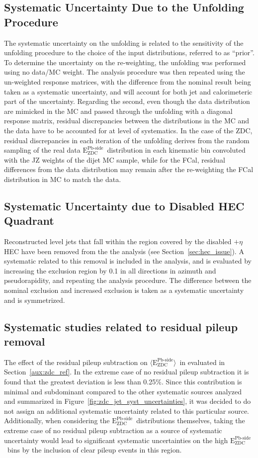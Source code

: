 \documentclass[NOTE, atlasdraft=true, texlive=2020, UKenglish]{atlasdoc}
\newcommand{\AZDC}{$\langle \text{E}_\text{ZDC}^\text{Pb-side} \rangle$}
\newcommand{\EZDC}{$\text{E}_\text{ZDC}^\text{Pb-side}$}
\begin{document}
\subsection{Systematic Uncertainty Due to the Unfolding Procedure}
\label{sec:prior}
The systematic uncertainty on the unfolding is related to the sensitivity of the unfolding procedure to the choice of the input distributions, referred to as ``prior''. To determine the uncertainty on the re-weighting, the unfolding was performed using no data/MC weight. 
The analysis procedure was then repeated using the un-weighted response matrices, with the difference from the nominal result being taken as a systematic uncertainty, and will account for both jet and calorimeteric part of the uncertainty. 
Regarding the second, even though the data distribution are mimicked in the MC and passed through the unfolding with a diagonal response matrix, residual discrepancies between the distributions in the MC and the data have to be accounted for at level of systematics. In the case of the ZDC, residual discrepancies in each iteration of the unfolding derives from the random sampling of the real data \EZDC\ distribution in each kinematic bin convoluted with the JZ weights of the dijet MC sample, while for the FCal, residual differences from the data distribution may remain after the re-weighting the FCal distribution in MC to match the data. 


\subsection{Systematic Uncertainty due to Disabled HEC Quadrant}
Reconstructed level jets that fall within the region covered by the disabled $+\eta$ HEC have been removed from the the analysis (see Section~\ref{sec:hec_issue}). A systematic related to this removal is included in the analysis, and is evaluated by increasing the exclusion region by 0.1 in all directions in azimuth and pseudorapidity, and repeating the analysis procedure. The difference between the nominal exclusion and increased exclusion is taken as a systematic uncertainty and is symmetrized.

\subsection{Systematic studies related to residual pileup removal}
The effect of the residual pileup subtraction on \AZDC\ in evaluated in Section~\ref{aux:zdc_ref}.  In the extreme case of no residual pileup subtraction it is found that the greatest deviation is less than 0.25\%.  Since this contribution is minimal and subdominant compared to the other systematic sources analyzed and summarized in Figure~\ref{fig:zdc_jet_syst_uncertainties}, it was decided to do not assign an additional systematic uncertainty related to this particular source. Additionally, when considering the \EZDC\ distributions themselves, taking the extreme case of no residual pileup subtraction as a source of systematic uncertainty would lead to significant systematic uncertainties on the high \EZDC\ bins by the inclusion of clear pileup events in this region.
\end{document}

